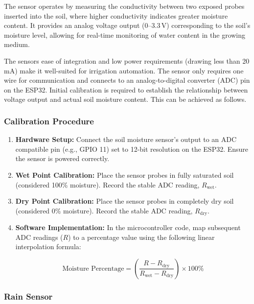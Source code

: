 The sensor operates by measuring the conductivity between two exposed probes inserted into the soil, where higher conductivity indicates greater moisture content. It provides an analog voltage output (0--3.3\,V) corresponding to the soil's moisture level, allowing for real-time monitoring of water content in the growing medium. 

The sensors ease of integration and low power requirements (drawing less than 20\,mA) make it well-suited for irrigation automation. The sensor only requires one wire for communication and connects to an analog-to-digital converter (ADC) pin on the ESP32. Initial calibration is required to establish the relationship between voltage output and actual soil moisture content. This can be achieved as follows. 

\subsubsection*{Calibration Procedure}

\begin{enumerate}
	\item \textbf{Hardware Setup:} Connect the soil moisture sensor's output to an ADC compatible pin (e.g., GPIO 11) set to 12-bit resolution on the ESP32. Ensure the sensor is powered correctly.
	
	\item \textbf{Wet Point Calibration:} Place the sensor probes in fully saturated soil (considered 100\% moisture). Record the stable ADC reading, \( R_{\text{wet}} \).
	
	\item \textbf{Dry Point Calibration:} Place the sensor probes in completely dry soil (considered 0\% moisture). Record the stable ADC reading, \( R_{\text{dry}} \).
	
	\item \textbf{Software Implementation:} In the microcontroller code, map subsequent ADC readings (\( R \)) to a percentage value using the following linear interpolation formula:
	
	\begin{equation}
		\text{Moisture Percentage} = \left( \frac{R - R_{\text{dry}}}{R_{\text{wet}} - R_{\text{dry}}} \right) \times 100\%
	\end{equation}
\end{enumerate}

\subsubsection{ Rain Sensor}

